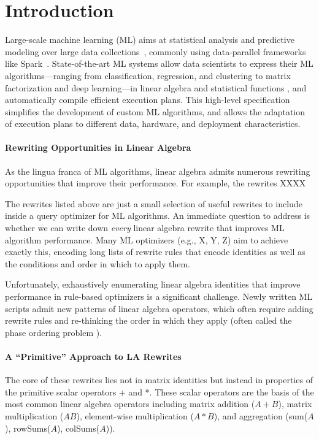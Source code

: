 \section{Introduction}
Large-scale machine learning (ML) aims at statistical analysis and predictive modeling over large data collections~\cite{CohenDDHW09}, commonly using data-parallel frameworks like Spark~\cite{ZahariaCDDMMFSS12}. State-of-the-art ML systems allow data scientists to express their ML algorithms---ranging from classification, regression, and clustering to matrix factorization and deep learning---in linear algebra and statistical functions \cite{AbadiBCCDDDGIIK16,BoehmDEEMPRRSST16,HuangB013,LuoGGPJ17,RohrmannSRG17,MahoutSamsara,StonebrakerBPR11,YuSC15,YuTAMAO17}, and automatically compile efficient execution plans. This high-level specification simplifies the development of custom ML algorithms, and allows the adaptation of execution plans to different data, hardware, and deployment characteristics.


\paragraph{Rewriting Opportunities in Linear Algebra} 
As the lingua franca of ML algorithms, linear algebra admits numerous rewriting opportunities that improve their performance.  For example, the rewrites XXXX 

The rewrites listed above are just a small selection of useful rewrites to include inside a query optimizer for ML algorithms.  An immediate question to address is whether we can write down \emph{every} linear algebra rewrite that improves ML algorithm performance. Many ML optimizers (e.g., X, Y, Z) aim to achieve exactly this, encoding long lists of rewrite rules that encode identities as well as the conditions and order in which to apply them.

Unfortunately, exhaustively enumerating linear algebra identities that improve performance in rule-based optimizers is a significant challenge.  Newly written ML scripts admit new patterns of linear algebra operators, which often require adding rewrite rules and re-thinking the order in which they apply (often called the phase ordering problem \cite{X}).


\paragraph{A ``Primitive'' Approach to LA Rewrites}
The core of these rewrites lies not in matrix identities but instead in properties of the primitive scalar operators + and *.  These scalar operators are the basis of the most common linear algebra operators including matrix addition ($A + B$), matrix multiplication ($AB$), element-wise multiplication ($A * B$), and aggregation (sum($A$), rowSums($A$), colSums($A$)).

